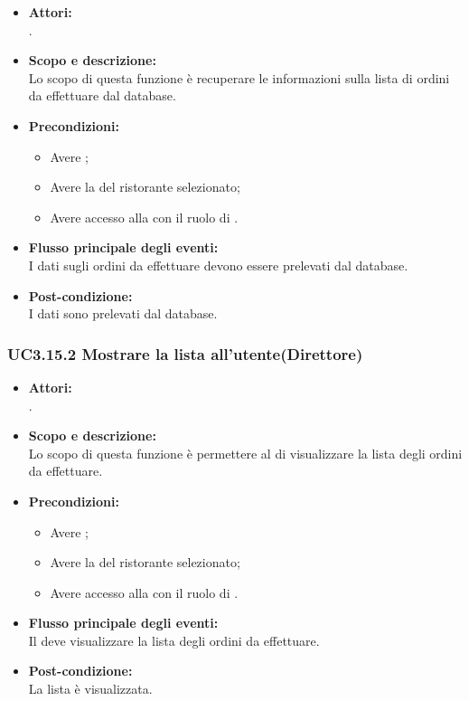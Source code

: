 \begin{itemize}
	\item \textbf{Attori:}
	\\.
	\item \textbf{Scopo e descrizione:} 
	\\Lo scopo di questa funzione è recuperare le informazioni sulla lista di ordini da effettuare dal database.
	\item \textbf{Precondizioni:}
	\begin{itemize}
		\item Avere ;
		\item Avere la  del ristorante selezionato;
		\item Avere accesso alla  con il ruolo di .
	\end{itemize}
	\item \textbf{Flusso principale degli eventi:}
	\\I dati sugli ordini da effettuare devono essere prelevati dal database.
	\item \textbf{Post-condizione:}
	\\I dati sono prelevati dal database.
\end{itemize}

\subsubsection{UC3.15.2 Mostrare la lista all'utente(Direttore)} \label{UC3.15.2}

\begin{itemize}
	\item \textbf{Attori:}
	\\.
	\item \textbf{Scopo e descrizione:} 
	\\Lo scopo di questa funzione è permettere al  di visualizzare la lista degli ordini da effettuare.
	\item \textbf{Precondizioni:}
	\begin{itemize}
		\item Avere ;
		\item Avere la  del ristorante selezionato;
		\item Avere accesso alla  con il ruolo di .
	\end{itemize}
	\item \textbf{Flusso principale degli eventi:}
	\\Il {} deve visualizzare la lista degli ordini da effettuare.
	\item \textbf{Post-condizione:}
	\\La lista è visualizzata.
\end{itemize}

